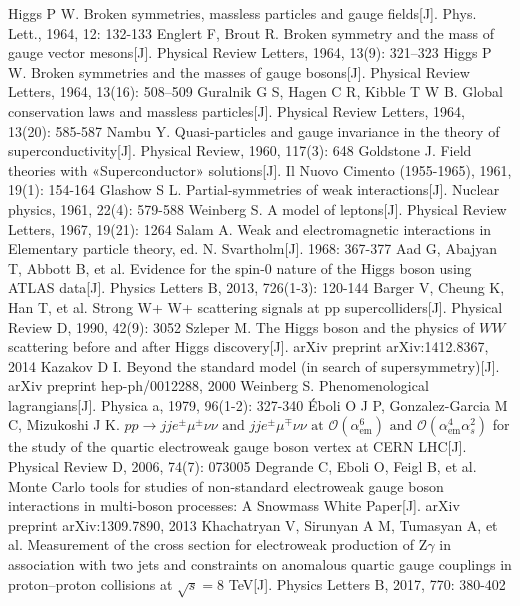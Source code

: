 \documentclass{SCIS2020cn}
\begin{document}
\begin{thebibliography}{99}
 Higgs P W. Broken symmetries, massless particles and gauge fields[J]. Phys. Lett., 1964, 12: 132-133
 Englert F, Brout R. Broken symmetry and the mass of gauge vector mesons[J]. Physical Review Letters, 1964, 13(9): 321–323
 Higgs P W. Broken symmetries and the masses of gauge bosons[J]. Physical Review Letters, 1964, 13(16): 508–509
 Guralnik G S, Hagen C R, Kibble T W B. Global conservation laws and massless particles[J]. Physical Review Letters, 1964, 13(20): 585-587
 Nambu Y. Quasi-particles and gauge invariance in the theory of superconductivity[J]. Physical Review, 1960, 117(3): 648
 Goldstone J. Field theories with «Superconductor» solutions[J]. Il Nuovo Cimento (1955-1965), 1961, 19(1): 154-164
 Glashow S L. Partial-symmetries of weak interactions[J]. Nuclear physics, 1961, 22(4): 579-588
 Weinberg S. A model of leptons[J]. Physical Review Letters, 1967, 19(21): 1264
 Salam A. Weak and electromagnetic interactions in Elementary particle theory, ed. N. Svartholm[J]. 1968: 367-377
 Aad G, Abajyan T, Abbott B, et al. Evidence for the spin-0 nature of the Higgs boson using ATLAS data[J]. Physics Letters B, 2013, 726(1-3): 120-144
 Barger V, Cheung K, Han T, et al. Strong W+ W+ scattering signals at pp supercolliders[J]. Physical Review D, 1990, 42(9): 3052
 Szleper M. The Higgs boson and the physics of $ WW $ scattering before and after Higgs discovery[J]. arXiv preprint arXiv:1412.8367, 2014
 Kazakov D I. Beyond the standard model (in search of supersymmetry)[J]. arXiv preprint hep-ph/0012288, 2000
 Weinberg S. Phenomenological lagrangians[J]. Physica a, 1979, 96(1-2): 327-340
 Éboli O J P, Gonzalez-Garcia M C, Mizukoshi J K. $p p \rightarrow j j e^{\pm} \mu^{\pm} \nu \nu \text { and } j j e^{\pm} \mu^{\mp} \nu \nu \text { at } \mathscr{O}\left(\alpha_{\mathrm{em}}^{6}\right) \text { and } \mathscr{O}\left(\alpha_{\mathrm{em}}^{4} \alpha_{s}^{2}\right)$ for the study of the quartic electroweak gauge boson vertex at CERN LHC[J]. Physical Review D, 2006, 74(7): 073005
 Degrande C, Eboli O, Feigl B, et al. Monte Carlo tools for studies of non-standard electroweak gauge boson interactions in multi-boson processes: A Snowmass White Paper[J]. arXiv preprint arXiv:1309.7890, 2013
 Khachatryan V, Sirunyan A M, Tumasyan A, et al. Measurement of the cross section for electroweak production of Z$\gamma$ in association with two jets and constraints on anomalous quartic gauge couplings in proton–proton collisions at $\sqrt{s} = 8$ TeV[J]. Physics Letters B, 2017, 770: 380-402

\end{thebibliography}
\end{document}
